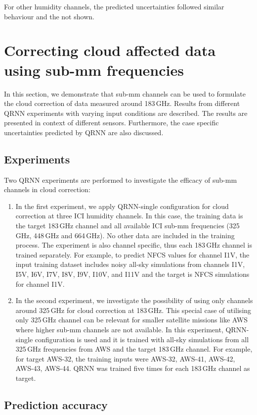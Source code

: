 \documentclass[amt, manuscript]{copernicus}
\begin{document}
For other humidity channels, the predicted uncertainties followed similar behaviour and the not shown. 


\section{Correcting cloud affected data using sub-mm frequencies}
In this section, we demonstrate that sub-mm channels can be used to formulate the cloud correction of data measured around 183\,GHz. Results from different QRNN experiments with varying input conditions are described. The results are presented in context of different sensors. Furthermore, the case specific uncertainties predicted by QRNN are also discussed.

\subsection{Experiments}
%
Two QRNN experiments are performed to investigate the efficacy of sub-mm channels in cloud correction: 
\begin{enumerate}
	\item In the first experiment, we apply QRNN-single configuration for cloud correction at three ICI humidity channels. In this case, the training data is the target 183\,GHz channel and all available ICI sub-mm frequencies (325\,GHz, 448\,GHz and 664\,GHz). No other data are included in the training process. The experiment is also channel specific, thus each 183\,GHz channel is trained separately. For example, to predict NFCS values for channel I1V, the input training dataset includes noisy all-sky simulations from channels I1V, I5V, I6V, I7V, I8V, I9V, I10V, and I11V and the target is NFCS simulations for channel I1V.
	
	\item In the second experiment, we investigate the possibility of using only channels around 325\,GHz for cloud correction at 183\,GHz. This special case of utilising only 325\,GHz channel can be relevant for smaller satellite missions like AWS where higher sub-mm channels are not available. In this experiment, QRNN-single configuration is used and it is trained with all-sky simulations from all 325\,GHz frequencies from AWS and the target 183\,GHz channel. For example, for target AWS-32, the training inputs were AWS-32, AWS-41, AWS-42, AWS-43, AWS-44. QRNN was trained five times for each 183\,GHz channel as target. 	
\end{enumerate}	

\subsection{Prediction accuracy}
\end{document}
